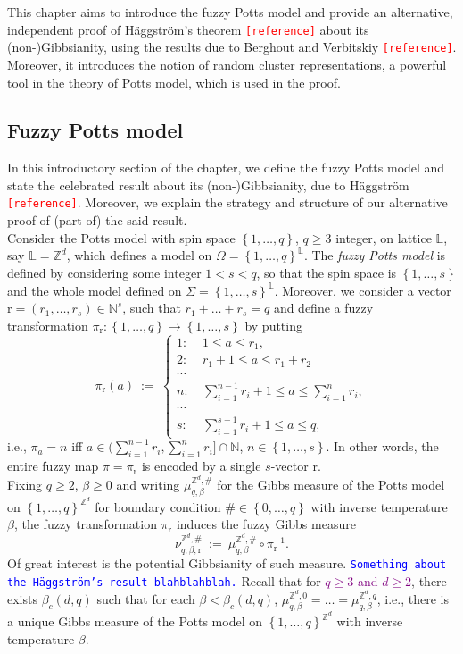 \documentclass[12pt]{article}
\renewcommand{\L}{\mathbb{L}}
\newcommand{\N}{\mathbb{N}}
\renewcommand{\r}{\mathrm{r}}
\newcommand{\Z}{\mathbb{Z}}
\newcommand{\set}[1]{\left\{#1\right\}}
\newcommand{\ra}{\rightarrow}
\newcommand{\1}{\mathbbm{1}}
\newcommand{\5}{\vspace{0.5cm}}
\theoremstyle{definition}
\begin{document}
This chapter aims to introduce the fuzzy Potts model and provide an alternative, independent proof of H\"aggstr\"om's theorem \textcolor{red}{\texttt{[reference]}} about its (non-)Gibbsianity, using the results due to Berghout and Verbitskiy \textcolor{red}{\texttt{[reference]}}. Moreover, it introduces the notion of random cluster representations, a powerful tool in the theory of Potts model, which is used in the proof.


\subsection{Fuzzy Potts model}

In this introductory section of the chapter, we define the fuzzy Potts model and state the celebrated result about its (non-)Gibbsianity, due to H\"aggstr\"om \textcolor{red}{\texttt{[reference]}}. Moreover, we explain the strategy and structure of our alternative proof of (part of) the said result. \\

Consider the Potts model with spin space $\set{1,\ldots,q}$, $q\geq 3$ integer, on lattice $\L$, say $\L=\Z^d$, which defines a model on $\Omega=\set{1,\ldots,q}^\L$. The \textit{fuzzy Potts model} is defined by considering some integer $1<s<q$, so that the spin space is $\set{1,\ldots,s}$ and the whole model defined on $\Sigma=\set{1,\ldots,s}^\L$. Moreover, we consider a vector $\r=(r_1,\ldots,r_s)\in\N^s$, such that $r_1+\ldots+r_s=q$ and define a fuzzy transformation $\pi_\r:\set{1,\ldots,q}\ra\set{1,\ldots,s}$ by putting 
$$\pi_\r(a) ~:=~ \begin{cases}
1: ~&1\leq a\leq r_1,\\
2: ~&r_1+1\leq a\leq r_1+r_2 \\
\cdots \\
n: ~&\sum_{i=1}^{n-1} r_i + 1\leq a\leq \sum_{i=1}^n r_i,\\
\cdots \\
s: ~&\sum_{i=1}^{s-1}r_i + 1\leq a\leq q,
\end{cases}$$
i.e., $\pi_a=n$ iff $a\in(\sum_{i=1}^{n-1}r_i,\sum_{i=1}^n r_i]\cap \N$, $n\in\set{1,\ldots,s}$. In other words, the entire fuzzy map $\pi=\pi_\r$ is encoded by a single $s$-vector $\r$. \\

Fixing $q\geq 2$, $\beta\geq 0$ and writing $\mu_{q,\beta}^{\Z^d,\#}$ for the Gibbs measure of the Potts model on $\set{1,\ldots,q}^{\Z^d}$ for boundary condition $\#\in\set{0,\ldots,q}$ with inverse temperature $\beta$, the fuzzy transformation $\pi_\r$ induces the fuzzy Gibbs measure 
$$\nu_{q,\beta,\r}^{\Z^d,\#} ~:=~ \mu_{q,\beta}^{\Z^d,\#}\circ\pi_\r^{-1}.$$
Of great interest is the potential Gibbsianity of such measure. \textcolor{blue}{\texttt{Something about the H\"aggstr\"om's result blahblahblah.}} Recall that for \textcolor{purple}{$q\geq 3$ and $d\geq 2$}, there exists $\beta_c(d,q)$ such that for each $\beta<\beta_c(d,q)$, $\mu_{q,\beta}^{\Z^d,0}=\ldots=\mu_{q,\beta}^{\Z^d,q}$, i.e., there is a unique Gibbs measure of the Potts model on $\set{1,\ldots,q}^{\Z^d}$ with inverse temperature $\beta$.
\end{document}
